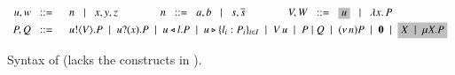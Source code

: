 	\begin{figure}[t]
	\[ 
		\begin{array}{rl}
			u,w  \bnfis& n \bnfbar x,y,z
			\qquad \qquad
			n \bnfis a,b \bnfbar s, \dual{s} 
			\qquad \qquad
			V,W \bnfis \nonhosyntax{u} \bnfbar \abs{x}{P}
			\\[1mm]

			P,Q
			 \bnfis &
			\bout{u}{V}{P}  \sbnfbar  \binp{u}{x}{P} \sbnfbar
			\bsel{u}{l} P \sbnfbar \bbra{u}{l_i:P_i}_{i \in I} \sbnfbar \appl{V}{u}\sbnfbar P\Par Q \sbnfbar \news{n} P 
			\sbnfbar \inact \sbnfbar \nonhosyntax{\rvar{X} \sbnfbar \recp{X}{P}}
		\end{array}
	\]
\vspace{-3mm}
	\caption{Syntax of \HOp (\HO lacks the constructs in ).}
	\label{fig:syntax}
	\vspace{-1mm}
\end{figure}

